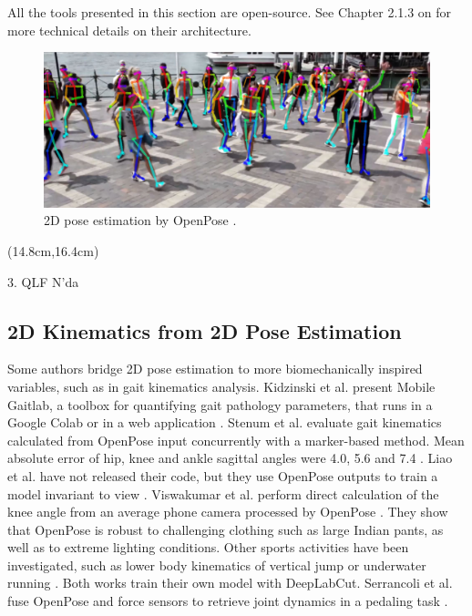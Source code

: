 All the tools presented in this section are open-source. See Chapter 2.1.3 on  for more technical details on their architecture.

\begin{figure}[hbtp]
	\centering
	\def\svgwidth{1\columnwidth}
	\fontsize{10pt}{10pt}\selectfont
	\includegraphics[width=0.9\linewidth]{"../Chap1/Figures/Fig_OpenPose.JPG"}
	\caption{2D pose estimation by OpenPose \cite{Cao2019}.}
	\label{fig_openpose}
\end{figure}

\begin{textblock*}{10cm}(14.8cm,16.4cm) %
	\begin{turn}{0}  
		  \scriptsize \emojiegg
		  \tiny 3. QLF N'da
		  \normalsize \emojirabbit
	\end{turn}
\end{textblock*}


\subsection{2D Kinematics from 2D Pose Estimation}

Some authors bridge 2D pose estimation to more biomechanically inspired variables, such as in gait kinematics analysis. Kidzinski et al. present Mobile Gaitlab, a toolbox for quantifying gait pathology parameters, that runs in a Google Colab or in a web application \cite{Kidziński2020}. Stenum et al. evaluate gait kinematics calculated from OpenPose input concurrently with a marker-based method. Mean absolute error of hip, knee and ankle sagittal angles were 4.0\degree{}, 5.6\degree{} and 7.4\degree{} \cite{Stenum2021}. Liao et al. have not released their code, but they use OpenPose outputs to train a model invariant to view \cite{Liao2020}. Viswakumar et al. perform direct calculation of the knee angle from an average phone camera processed by OpenPose \cite{Viswakumar2019}. They show that OpenPose is robust to challenging clothing such as large Indian pants, as well as to extreme lighting conditions. Other sports activities have been investigated, such as lower body kinematics of vertical jump \cite{Drazan2021} or underwater running \cite{Cronin2019}. Both works train their own model with DeepLabCut. Serrancoli et al. fuse OpenPose and force sensors to retrieve joint dynamics in a pedaling task \cite{Serrancolí2020}. 

